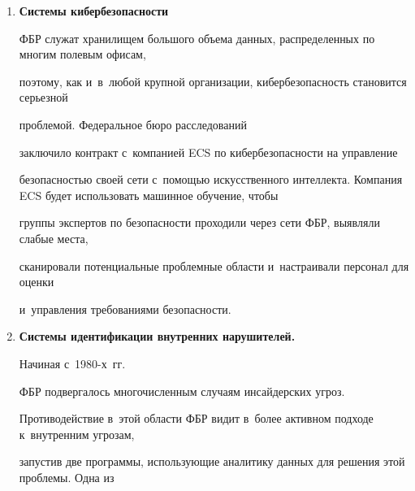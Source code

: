 \begin{enumerate}[1.]
к~CODIS. Это именно то, что ФБР хочет сделать, руководствуясь Актом о~быстрой ДНК


от~2017~г. Среди прочего, это позволяет агентству создать сеть из этих машин, чтобы получить


доступ к~CODIS. В~2018~г.\ Национальный институт стандартов и~технологий (NIST, National Institute of Standards and


Technology) провел


оценку работы комплексов быстрой ДНК. Результаты показали, что, хотя машины способны


работать самостоятельно, модифицированный анализ с~вмешательством человека дал результаты


с~более высокой точ\-ностью.


\item %


\textbf{Системы кибербезопасности}


ФБР служат хранилищем большого объема данных, распределенных по многим полевым офисам,


поэтому, как и~в~любой крупной организации, кибербезопасность становится серьезной


проблемой. Федеральное бюро расследований


заключило контракт с~компанией ECS по кибербезопасности на управление


безопасностью своей сети с~по\-мощью искусственного интеллекта. Компания ECS будет использовать машинное обучение, чтобы


группы экспертов по безопас\-ности проходили через сети ФБР, выявляли слабые места,


сканировали потенциальные проб\-лем\-ные области и~настраивали персонал для оценки


и~управления требованиями безопас\-ности.





\item %


\textbf{Системы идентификации внутренних нарушителей.}


Начиная с~\mbox{1980-х}~гг.


ФБР подвергалось многочисленным случаям инсайдерских угроз.


Противодействие в~этой области ФБР видит в~более активном подходе к~внутренним угрозам,


запустив две программы, использующие аналитику данных для решения этой проблемы. Одна из



\end{enumerate}

